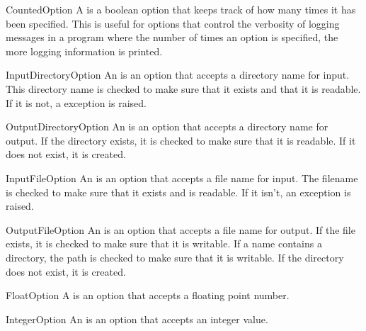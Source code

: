 \begin{classdesc}{CountedOption}{}
A  is a boolean option that keeps track of how many
times it has been specified.  This is useful for options that control 
the verbosity of logging messages in a program where the number of times
an option is specified, the more logging information is printed.
\end{classdesc}

\begin{classdesc}{InputDirectoryOption}{}
An  is an option that accepts a directory name
for input.
This directory name is checked to make sure that it exists and that it is
readable.  If it is not, a  exception is 
raised.
\end{classdesc}

\begin{classdesc}{OutputDirectoryOption}{}
An  is an option that accepts a directory name
for output.  If the directory exists, it is checked to make sure that it is
readable.  If it does not exist, it is created.
\end{classdesc}

\begin{classdesc}{InputFileOption}{}
An  is an option that accepts a file name for input.
The filename is checked to make sure that it exists and is readable.  If
it isn't, an  exception is raised.
\end{classdesc}

\begin{classdesc}{OutputFileOption}{}
An  is an option that accepts a file name for output.
If the file exists, it is checked to make sure that it is writable.  
If a name contains a directory, the path is checked to make sure that it is 
writable.  If the directory does not exist, it is created. 
\end{classdesc}

\begin{classdesc}{FloatOption}{}
A  is an option that accepts a floating point number.
\end{classdesc}

\begin{classdesc}{IntegerOption}{}
An  is an option that accepts an integer value.
\end{classdesc}

